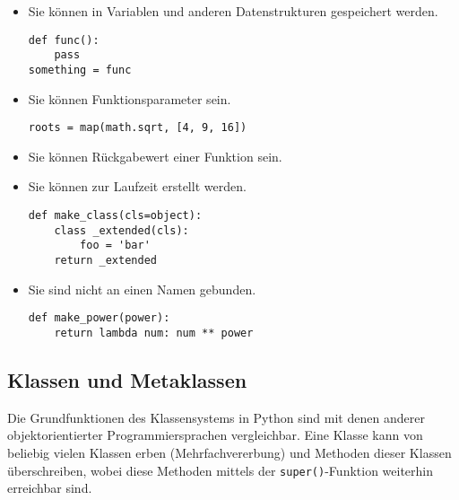 \begin{itemize}
\item Sie können in Variablen und anderen Datenstrukturen gespeichert werden.
\begin{lstlisting}[caption=Zuweisung einer Funktion an eine Variable]
def func():
    pass
something = func
\end{lstlisting}

\item Sie können Funktionsparameter sein.
\begin{lstlisting}[caption=Funktion als Funktionsparameter]
roots = map(math.sqrt, [4, 9, 16])
\end{lstlisting}

\item Sie können Rückgabewert einer Funktion sein.

\item Sie können zur Laufzeit erstellt werden.
\begin{lstlisting}[caption=Klasse wird zur Laufzeit erstellt]
def make_class(cls=object):
    class _extended(cls):
        foo = 'bar'
    return _extended
\end{lstlisting}

\item Sie sind nicht an einen Namen gebunden.
\begin{lstlisting}[caption=Anonyme lambda-Funktion]
def make_power(power):
    return lambda num: num ** power
\end{lstlisting}
\end{itemize}



\subsection{Klassen und Metaklassen}
Die Grundfunktionen des Klassensystems in Python sind mit denen anderer objektorientierter
Programmiersprachen vergleichbar. Eine Klasse kann von beliebig vielen Klassen erben
(Mehrfachvererbung) und Methoden dieser Klassen überschreiben, wobei diese Methoden mittels der
\lstinline{super()}-Funktion weiterhin erreichbar sind.

